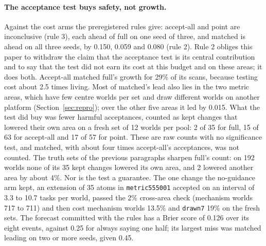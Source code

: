 \documentclass[11pt]{article}
\begin{document}
\paragraph{The acceptance test buys safety, not growth.} Against the cost arms the preregistered rules give: accept-all and point are inconclusive (rule 3), each ahead of full on one seed of three, and matched is ahead on all three seeds, by 0.150, 0.059 and 0.080 (rule 2). Rule 2 obliges this paper to withdraw the claim that the acceptance test is its central contribution and to say that the test did not earn its cost at this budget and on these areas; it does both. Accept-all matched full's growth for 29\% of its scans, because testing cost about 2.5 times living. Most of matched's lead also lies in the two metric areas, which have few centre worlds per set and draw different worlds on another platform (Section~\ref{sec:repro}); over the other five areas it led by 0.015. What the test did buy was fewer harmful acceptances, counted as kept changes that lowered their own area on a fresh set of 12 worlds per pool: 2 of 35 for full, 15 of 63 for accept-all and 17 of 57 for point. These are raw counts with no significance test, and matched, with about four times accept-all's acceptances, was not counted. The truth sets of the previous paragraphs sharpen full's count: on 192 worlds none of its 35 kept changes lowered its own area, and 2 lowered another area by about 4\%. Nor is the test a guarantee. The one change the no-guidance arm kept, an extension of 35 atoms in \texttt{metric555001} accepted on an interval of 3.3 to 10.7 tasks per world, passed the 2\% cross-area check (mechanism worlds 717 to 711) and then cost mechanism worlds 13.5\% and \texttt{drawn7} 19\% on the fresh sets. The forecast committed with the rules has a Brier score of 0.126 over its eight events, against 0.25 for always saying one half; its largest miss was matched leading on two or more seeds, given 0.45.
\end{document}
